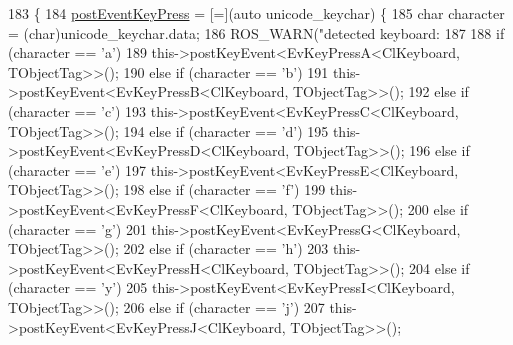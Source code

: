\begin{DoxyCode}
183         \{
184                 \hyperlink{classsm__three__some_1_1cl__keyboard_1_1ClKeyboard_abb3140ba3850b4e20f201a697b7f8388}{postEventKeyPress} = [=](\textcolor{keyword}{auto} unicode\_keychar) \{
185                         \textcolor{keywordtype}{char} character = (char)unicode\_keychar.data;
186                         ROS\_WARN(\textcolor{stringliteral}{"detected keyboard: %
187 
188                         \textcolor{keywordflow}{if} (character == \textcolor{charliteral}{'a'})
189                                 this->postKeyEvent<EvKeyPressA<ClKeyboard, TObjectTag>>();
190                         \textcolor{keywordflow}{else} \textcolor{keywordflow}{if} (character == \textcolor{charliteral}{'b'})
191                                 this->postKeyEvent<EvKeyPressB<ClKeyboard, TObjectTag>>();
192                         \textcolor{keywordflow}{else} \textcolor{keywordflow}{if} (character == \textcolor{charliteral}{'c'})
193                                 this->postKeyEvent<EvKeyPressC<ClKeyboard, TObjectTag>>();
194                         \textcolor{keywordflow}{else} \textcolor{keywordflow}{if} (character == \textcolor{charliteral}{'d'})
195                                 this->postKeyEvent<EvKeyPressD<ClKeyboard, TObjectTag>>();
196                         \textcolor{keywordflow}{else} \textcolor{keywordflow}{if} (character == \textcolor{charliteral}{'e'})
197                                 this->postKeyEvent<EvKeyPressE<ClKeyboard, TObjectTag>>();
198                         \textcolor{keywordflow}{else} \textcolor{keywordflow}{if} (character == \textcolor{charliteral}{'f'})
199                                 this->postKeyEvent<EvKeyPressF<ClKeyboard, TObjectTag>>();
200                         \textcolor{keywordflow}{else} \textcolor{keywordflow}{if} (character == \textcolor{charliteral}{'g'})
201                                 this->postKeyEvent<EvKeyPressG<ClKeyboard, TObjectTag>>();
202                         \textcolor{keywordflow}{else} \textcolor{keywordflow}{if} (character == \textcolor{charliteral}{'h'})
203                                 this->postKeyEvent<EvKeyPressH<ClKeyboard, TObjectTag>>();
204                         \textcolor{keywordflow}{else} \textcolor{keywordflow}{if} (character == \textcolor{charliteral}{'y'})
205                                 this->postKeyEvent<EvKeyPressI<ClKeyboard, TObjectTag>>();
206                         \textcolor{keywordflow}{else} \textcolor{keywordflow}{if} (character == \textcolor{charliteral}{'j'})
207                                 this->postKeyEvent<EvKeyPressJ<ClKeyboard, TObjectTag>>();
}
\end{DoxyCode}
